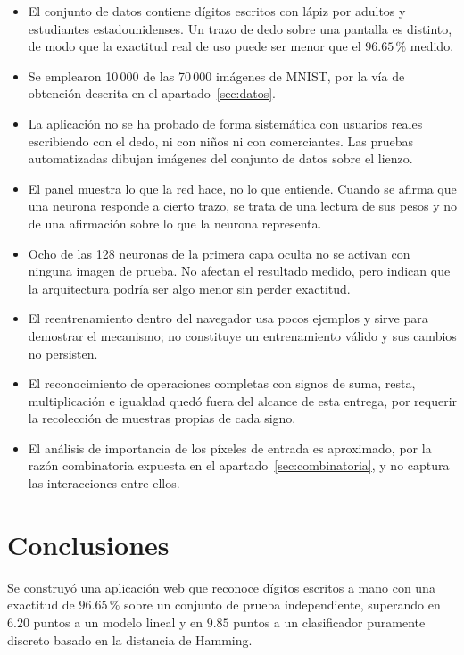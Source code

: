 \documentclass[12pt,letterpaper]{article}
\newcommand{\pc}{\,\%}
\begin{document}
\begin{itemize}
\item El conjunto de datos contiene dígitos escritos con lápiz por adultos y
  estudiantes estadounidenses. Un trazo de dedo sobre una pantalla es distinto, de
  modo que la exactitud real de uso puede ser menor que el $96.65\pc$ medido.
\item Se emplearon 10\,000 de las 70\,000 imágenes de MNIST, por la vía de obtención
  descrita en el apartado~\ref{sec:datos}.
\item La aplicación no se ha probado de forma sistemática con usuarios reales
  escribiendo con el dedo, ni con niños ni con comerciantes. Las pruebas
  automatizadas dibujan imágenes del conjunto de datos sobre el lienzo.
\item El panel muestra lo que la red hace, no lo que entiende. Cuando se afirma que
  una neurona responde a cierto trazo, se trata de una lectura de sus pesos y no de
  una afirmación sobre lo que la neurona representa.
\item Ocho de las 128 neuronas de la primera capa oculta no se activan con ninguna
  imagen de prueba. No afectan el resultado medido, pero indican que la arquitectura
  podría ser algo menor sin perder exactitud.
\item El reentrenamiento dentro del navegador usa pocos ejemplos y sirve para
  demostrar el mecanismo; no constituye un entrenamiento válido y sus cambios no
  persisten.
\item El reconocimiento de operaciones completas con signos de suma, resta,
  multiplicación e igualdad quedó fuera del alcance de esta entrega, por requerir la
  recolección de muestras propias de cada signo.
\item El análisis de importancia de los píxeles de entrada es aproximado, por la
  razón combinatoria expuesta en el apartado~\ref{sec:combinatoria}, y no captura las
  interacciones entre ellos.
\end{itemize}

\section{Conclusiones}

Se construyó una aplicación web que reconoce dígitos escritos a mano con una exactitud
de $96.65\pc$ sobre un conjunto de prueba independiente, superando en $6.20$ puntos a
un modelo lineal y en $9.85$ puntos a un clasificador puramente discreto basado en la
distancia de Hamming.
\end{document}
